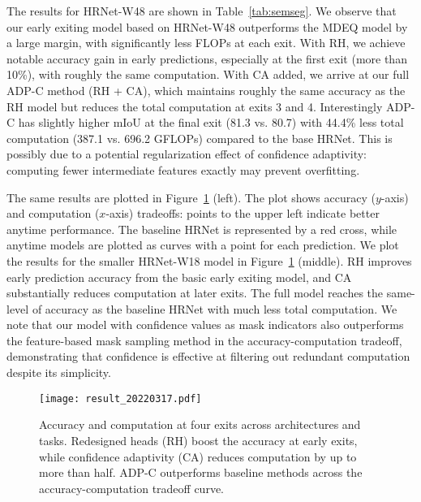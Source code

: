 The results for HRNet-W48 are shown in Table~\ref{tab:semseg}.
We observe that our early exiting model based on HRNet-W48 outperforms the MDEQ model by a large margin, with significantly less FLOPs at each exit.
With RH, we achieve notable accuracy gain in early predictions, especially at the first exit (more than 10\%), with roughly the same computation.
With CA added, we arrive at our full ADP-C method (RH + CA), which maintains roughly the same accuracy as the RH model but reduces the total computation at exits 3 and 4.
Interestingly ADP-C has slightly higher mIoU at the final exit (81.3 vs. 80.7) with 44.4\% less total computation (387.1 vs. 696.2 GFLOPs) compared to the base HRNet.
This is possibly due to a potential regularization effect of confidence adaptivity: computing fewer intermediate features exactly may prevent overfitting.



The same results are plotted in Figure~\ref{fig:result} (left).
The plot shows accuracy ($y$-axis) and computation ($x$-axis) tradeoffs: points to the upper left indicate better anytime performance.
The baseline HRNet is represented by a red cross, while anytime models are plotted as curves with a point for each prediction.
We plot the results for the smaller HRNet-W18 model in Figure~\ref{fig:result} (middle).
RH improves early prediction accuracy from the basic early exiting model, and CA substantially reduces computation at later exits.
The full model reaches the same-level of accuracy as the baseline HRNet with much less total computation. We note that our model with confidence values as mask indicators also outperforms the feature-based mask sampling method in the accuracy-computation tradeoff, demonstrating that confidence is effective at filtering out redundant computation despite its simplicity.

\begin{figure}[!htbp]
\texttt{[image: result\_20220317.pdf]}
\caption{%
Accuracy and computation at four exits across architectures and tasks.
Redesigned heads (RH) boost the accuracy at early exits, while confidence adaptivity (CA) reduces computation by up to more than half.
ADP-C outperforms baseline methods across the accuracy-computation tradeoff curve.
}
\label{fig:result}
\end{figure}


